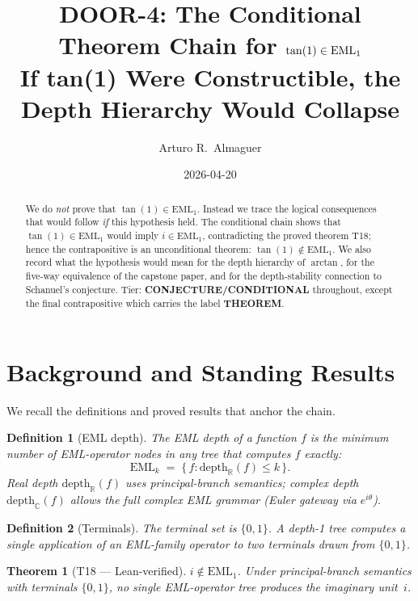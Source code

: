 \documentclass[11pt]{article}
\title{DOOR-4: The Conditional Theorem Chain for $\tan(1) \in \EML{1}$\\[4pt]
       \large If tan(1) Were Constructible, the Depth Hierarchy Would Collapse}
\author{Arturo R.\ Almaguer}
\date{2026-04-20}
\newtheorem{theorem}{Theorem}
\newtheorem{definition}{Definition}
\newcommand{\EML}[1]{\mathrm{EML}_{#1}}
\newcommand{\depthR}{\mathrm{depth}_{\mathbb{R}}}
\newcommand{\depthC}{\mathrm{depth}_{\mathbb{C}}}
\begin{document}
\maketitle

\begin{abstract}
We do \emph{not} prove that $\tan(1) \in \EML{1}$.  Instead we trace the
logical consequences that would follow \emph{if} this hypothesis held.  The
conditional chain shows that $\tan(1) \in \EML{1}$ would imply
$i \in \EML{1}$, contradicting the proved theorem T18; hence the contrapositive
is an unconditional theorem: $\tan(1) \notin \EML{1}$.  We also record what
the hypothesis would mean for the depth hierarchy of $\arctan$, for the
five-way equivalence of the capstone paper, and for the depth-stability
connection to Schanuel's conjecture.  Tier: \textbf{CONJECTURE/CONDITIONAL} throughout,
except the final contrapositive which carries the label \textbf{THEOREM}.
\end{abstract}

\section{Background and Standing Results}

We recall the definitions and proved results that anchor the chain.

\begin{definition}[EML depth]\label{def:depth}
The \emph{EML depth} of a function $f$ is the minimum number of EML-operator
nodes in any tree that computes $f$ exactly:
\[
  \EML{k} \;=\; \bigl\{\,f : \depthR(f) \leq k\,\bigr\}.
\]
Real depth $\depthR(f)$ uses principal-branch semantics; complex depth
$\depthC(f)$ allows the full complex EML grammar (Euler gateway via
$e^{i\theta}$).
\end{definition}

\begin{definition}[Terminals]\label{def:terminals}
The terminal set is $\{0, 1\}$.  A depth-1 tree computes a single application
of an EML-family operator to two terminals drawn from $\{0,1\}$.
\end{definition}

\begin{theorem}[T18 — Lean-verified]\label{thm:T18}
$i \notin \EML{1}$.  Under principal-branch semantics with terminals
$\{0, 1\}$, no single EML-operator tree produces the imaginary unit~$i$.
\end{theorem}
\end{document}
